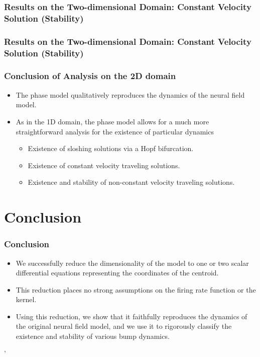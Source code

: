 \documentclass{beamer}
\begin{document}
\begin{frame}
\frametitle{Results on the Two-dimensional Domain: Constant Velocity Solution (Stability)}
\begin{center}
\end{center}
\end{frame}


\begin{frame}
\frametitle{Results on the Two-dimensional Domain: Constant Velocity Solution (Stability)}
\begin{center}
\end{center}
\end{frame}



\begin{frame}
 \frametitle{Conclusion of Analysis on the 2D domain}
 \begin{itemize}
  \item The phase model qualitatively reproduces the dynamics of the neural field model.
  \item As in the 1D domain, the phase model allows for a much more straightforward analysis for the existence of particular dynamics
  \begin{itemize}
  \item Existence of sloshing solutions via a Hopf bifurcation.
  \item Existence of constant velocity traveling solutions.
  \item Existence and stability of non-constant velocity traveling solutions.
 \end{itemize}
\end{itemize}
\end{frame}


\section{Conclusion}
\begin{frame}
 \frametitle{Conclusion}
 \vspace{-.1in}
 \begin{itemize}
  \item We successfully reduce the dimensionality of the model to one or two scalar differential equations representing the coordinates of the centroid.
  \item This reduction places no strong assumptions on the firing rate function or the kernel.
  \item Using this reduction, we show that it faithfully reproduces the dynamics of the original neural field model, and we use it to rigorously classify the existence and stability of various bump dynamics.
 \end{itemize}'


\end{frame}
\end{document}
